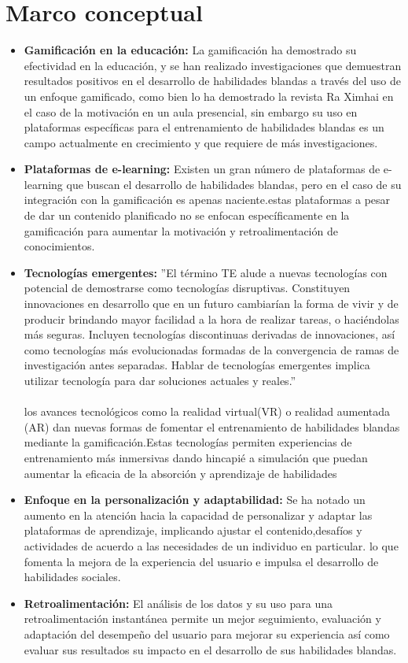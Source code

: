 \section{Marco conceptual}
\begin{itemize}
    
    \item \textbf{Gamificación en la educación:}
    La gamificación ha demostrado su efectividad en la educación, y se han realizado investigaciones que demuestran resultados positivos en el desarrollo de habilidades blandas a través del uso de un enfoque gamificado, como bien lo ha demostrado la revista Ra Ximhai\cite{j} en el caso de la motivación en un aula presencial, sin embargo su uso en  plataformas específicas para el entrenamiento de habilidades blandas es un campo actualmente en crecimiento y que requiere de más investigaciones.
    \item \textbf{Plataformas de e-learning:} Existen un gran número de plataformas de e-learning que buscan el desarrollo de habilidades blandas, pero en el caso de su integración con la gamificación es apenas naciente.estas plataformas a pesar de dar un contenido planificado no se enfocan específicamente en la gamificación para aumentar la motivación y retroalimentación de conocimientos.

    \item \textbf{Tecnologías emergentes:} ”El término TE alude a nuevas tecnologías con potencial de demostrarse como tecnologías disruptivas. Constituyen innovaciones en desarrollo que en un futuro cambiarían la forma de vivir y de producir brindando mayor facilidad a la hora de realizar tareas, o haciéndolas más seguras. Incluyen tecnologías discontinuas derivadas de innovaciones, así como tecnologías más evolucionadas formadas de la convergencia de ramas de investigación antes separadas. Hablar de tecnologías emergentes implica utilizar tecnología para dar soluciones actuales y reales.” \cite{k}
     \\ \\
los avances tecnológicos como la realidad virtual(VR) o realidad aumentada (AR) dan nuevas formas de fomentar el entrenamiento de habilidades blandas mediante la gamificación.Estas tecnologías permiten experiencias de entrenamiento más inmersivas dando hincapié a simulación que puedan aumentar la eficacia de la absorción y aprendizaje de habilidades

    \item \textbf{Enfoque en la personalización y adaptabilidad:} Se ha notado un aumento en la atención hacia la capacidad de personalizar y adaptar las plataformas de aprendizaje, implicando ajustar el contenido,desafíos y actividades de acuerdo a las necesidades de un individuo en particular. lo que fomenta la mejora de la experiencia del usuario e impulsa el desarrollo de habilidades sociales.
    \item \textbf{Retroalimentación:} El análisis de los datos y su uso para una retroalimentación instantánea permite un mejor seguimiento, evaluación y adaptación del desempeño del usuario para mejorar su experiencia así como evaluar sus resultados su impacto en el desarrollo de sus habilidades blandas.
\end{itemize}


